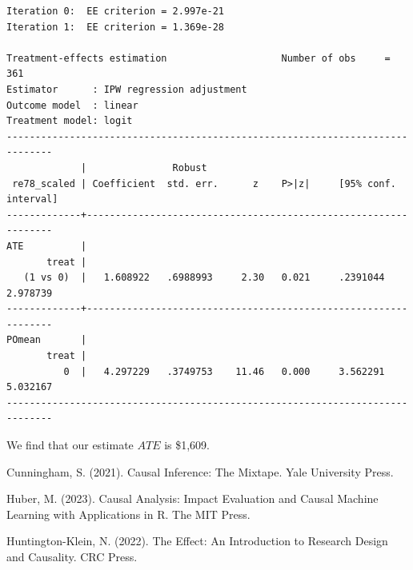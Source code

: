 \documentclass[
]{book}
\begin{document}
\begin{verbatim}
Iteration 0:  EE criterion = 2.997e-21  
Iteration 1:  EE criterion = 1.369e-28  

Treatment-effects estimation                    Number of obs     =        361
Estimator      : IPW regression adjustment
Outcome model  : linear
Treatment model: logit
------------------------------------------------------------------------------
             |               Robust
 re78_scaled | Coefficient  std. err.      z    P>|z|     [95% conf. interval]
-------------+----------------------------------------------------------------
ATE          |
       treat |
   (1 vs 0)  |   1.608922   .6988993     2.30   0.021     .2391044    2.978739
-------------+----------------------------------------------------------------
POmean       |
       treat |
          0  |   4.297229   .3749753    11.46   0.000     3.562291    5.032167
------------------------------------------------------------------------------
\end{verbatim}

We find that our estimate \(ATE\) is \$1,609.

Cunningham, S. (2021). Causal Inference: The Mixtape. Yale University Press.

Huber, M. (2023). Causal Analysis: Impact Evaluation and Causal Machine Learning with Applications in R. The MIT Press.

Huntington-Klein, N. (2022). The Effect: An Introduction to Research Design and Causality. CRC Press.


\end{document}
